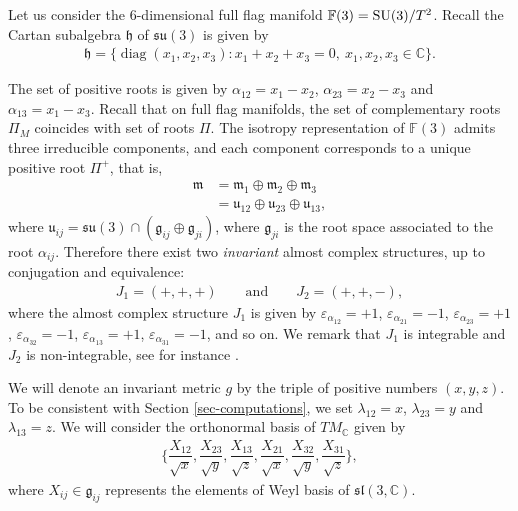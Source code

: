 \documentclass[10pt,a4paper]{amsart}
\numberwithin{equation}{section}
\DeclareMathOperator{\Diag}{diag}
\begin{document}
Let us consider the 6-dimensional full flag manifold $\mathbb{F}(3)={\rm SU}(3)/T^2$. Recall the Cartan subalgebra $\mathfrak{h}$ of $\mathfrak{su}(3)$ is given by
\begin{gather*}
\mathfrak{h}=\{\Diag(x_{1},x_{2},x_{3})\colon x_{1}+x_{2}+x_{3}=0,\ x_{1},x_{2},x_{3}\in\mathbb{C}\}.
\end{gather*}

The set of positive roots is given by $\alpha_{12}=x_{1}-x_{2}$, $\alpha_{23}=x_{2}-x_{3}$ and $\alpha_{13}=x_{1}-x_{3}$. Recall that on full flag manifolds, the set of complementary roots $\Pi_{M}$ coincides with set of roots $\Pi$. The isotropy representation of $\mathbb{F}(3)$ admits three irreducible components, and each component corresponds to a unique positive root $\Pi^{+}$, that is,
\begin{align*}
\mathfrak{m}&=\mathfrak{m}_{1}\oplus\mathfrak{m}_{2}\oplus \mathfrak{m}_{3}
\\
&=\mathfrak{u}_{12}\oplus \mathfrak{u}_{23}\oplus \mathfrak{u}_{13},
\end{align*}
where $\mathfrak{u}_{ij}=\mathfrak{su}(3)\cap (\mathfrak{g}_{ij}\oplus \mathfrak{g}_{ji})$, where $\mathfrak{g}_{ji}$ is the root space associated to the root $\alpha_{ij}$.
Therefore there exist two {\it invariant} almost complex structures, up to conjugation and equivalence:
\begin{gather*}
J_{1}=(+,+,+)\qquad \text{and}\qquad J_{2}=(+,+,-),
\end{gather*}
where the almost complex structure $J_1$ is given by $ \varepsilon_{\alpha_{12}} = +1$, $\varepsilon_{\alpha_{21}} = -1$, $\varepsilon_{\alpha_{23}} = +1$, $ \varepsilon_{\alpha_{32}} = -1$, $\varepsilon_{\alpha_{13}} = +1$, $\varepsilon_{\alpha_{31}} = -1$, and so on. We remark that $J_1$ is integrable and $J_2$ is non-integrable, see for instance \cite{sn}.

We will denote an invariant metric $g$ by the triple of positive numbers $(x,y,z)$. To be consistent with Section \ref{sec-computations}, we set $\lambda_{12}=x$, $\lambda_{23}=y$ and $\lambda_{13}=z$. We will consider the orthonormal basis of $TM_{\mathbb{C}}$ given by
\begin{gather*}
\bigg\{\dfrac{X_{12}}{\sqrt{x}},\dfrac{X_{23}}{\sqrt{y}},\dfrac{X_{13}}{\sqrt{z}},\dfrac{X_{21}}{\sqrt{x}},
\dfrac{X_{32}}{\sqrt{y}},\dfrac{X_{31}}{\sqrt{z}}\bigg\},
\end{gather*}
where $X_{ij}\in \mathfrak{g}_{ij}$ represents the elements of Weyl basis of $\mathfrak{sl}(3,\mathbb{C})$.
\end{document}
